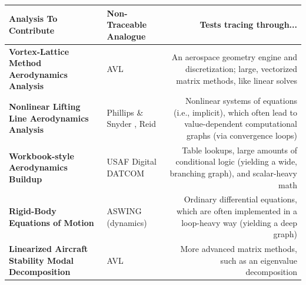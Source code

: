 \documentclass[12pt,vi,oneside]{report}
\begin{document}
\begin{table}[H]
\begin{adjustbox}{width=\textwidth}
            \begin{tabularx}{1.2\textwidth}{M E D}
                \toprule
                \textbf{Analysis To Contribute}                            & \textbf{Non-Traceable Analogue}                                               & \textbf{Tests tracing through...}                                                                                                 \\ \toprule
                \textbf{Vortex-Lattice Method Aerodynamics Analysis}       & AVL \cite{avl}                                                                & An aerospace geometry engine and discretization; large, vectorized matrix methods, like linear solves                             \\ \midrule
                \textbf{Nonlinear Lifting Line Aerodynamics Analysis}      & Phillips \& Snyder \cite{phillips_modern_2000}, Reid \cite{reid_general_2020} & Nonlinear systems of equations (i.e., implicit), which often lead to value-dependent computational graphs (via convergence loops) \\ \midrule
                \textbf{Workbook-style Aerodynamics Buildup}               & USAF Digital DATCOM \cite{datcom}                                             & Table lookups, large amounts of conditional logic (yielding a wide, branching graph), and scalar-heavy math                       \\ \midrule
                \textbf{Rigid-Body Equations of Motion}                    & ASWING (dynamics) \cite{aswing}                                               & Ordinary differential equations, which are often implemented in a loop-heavy way (yielding a deep graph)                          \\ \midrule
                \textbf{Linearized Aircraft Stability Modal Decomposition} & AVL \cite{avl}                                                                & More advanced matrix methods, such as an eigenvalue decomposition                                                                 \\
                \bottomrule
            \end{tabularx}

        \end{adjustbox}
    \end{table}
\end{document}
